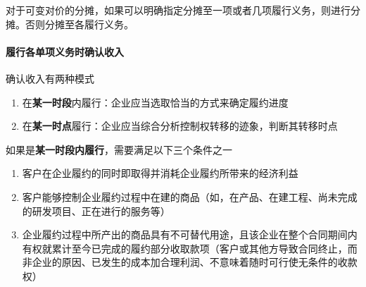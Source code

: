 \documentclass[UTF8,12pt]{ctexart}
\numberwithin{equation}{section} %
\numberwithin{figure}{section}
\numberwithin{table}{section}
\begin{document}
	对于可变对价的分摊，如果可以明确指定分摊至一项或者几项履行义务，则进行分摊。否则分摊至各履行义务。
	
	
	\paragraph{履行各单项义务时确认收入}
	
	确认收入有两种模式
	\begin{enumerate}
		\item 在\textbf{某一时段}内履行：企业应当选取恰当的方式来确定履约进度
		
		\item 在\textbf{某一时点}履行：企业应当综合分析控制权转移的迹象，判断其转移时点
	\end{enumerate}

	如果是\textbf{某一时段内履行}，需要满足以下三个条件之一
	\begin{enumerate}
		\item 客户在企业履约的同时即取得并消耗企业履约所带来的经济利益
		
		\item 客户能够控制企业履约过程中在建的商品（如，在产品、在建工程、尚未完成的研发项目、正在进行的服务等）
		
		\item 企业履约过程中所产出的商品具有不可替代用途，且该企业在整个合同期间内有权就累计至今已完成的履约部分收取款项（客户或其他方导致合同终止，而非企业的原因、已发生的成本加合理利润、不意味着随时可行使无条件的收款权）
	\end{enumerate}
\end{document}
